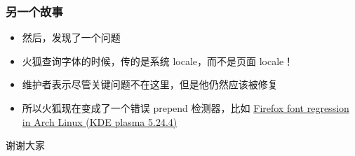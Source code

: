 \documentclass[UTF-8]{ctexbeamer}
\begin{document}
\begin{frame}[fragile]
	\frametitle{另一个故事}
	
	\begin{itemize}[<+->]
		\item 然后，发现了一个问题
		\item 火狐查询字体的时候，传的是系统 locale，而不是页面 locale！
		\item 维护者表示尽管关键问题不在这里，但是他仍然应该被修复
		\item 所以火狐现在变成了一个错误 prepend 检测器，比如 \href{https://bugzilla.mozilla.org/show_bug.cgi?id=1763175}{Firefox font regression in Arch Linux (KDE plasma 5.24.4)}
	\end{itemize}
	
\end{frame}

\begin{frame}
	\begin{center}
		\huge{谢谢大家}
	\end{center}

\end{frame}
\end{document}
